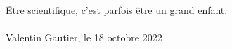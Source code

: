 
\cleardoublepage

~ \vspace{3.5cm}
\thispagestyle{empty}
\begin{flushright}
\og \^ Etre scientifique, c'est parfois être un grand enfant. \fg 
\\~\\
Valentin Gautier, le 18 octobre 2022
\end{flushright}